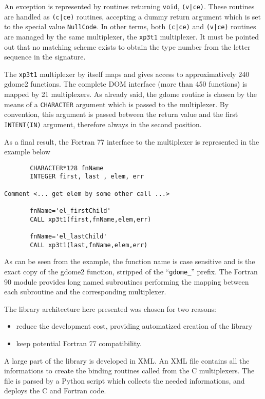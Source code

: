 An exception is represented by routines returning \texttt{void},
\texttt{(v|ce)}. These routines are handled as \texttt{(c|ce)} routines,
accepting a dummy return argument which is set to the special value
\texttt{NullCode}. In other terms, both \texttt{(c|ce)} and \texttt{(v|ce)}
routines are managed by the same multiplexer, the \texttt{xp3t1} multiplexer.
It must be pointed out that no matching scheme exists to obtain the type
number from the letter sequence in the signature. 

The \texttt{xp3t1} multiplexer by itself maps and gives access to
approximatively 240 gdome2 functions. The complete DOM interface (more than
450 functions) is mapped by 21 multiplexers. As already said, the
gdome routine is chosen by the means of a \texttt{CHARACTER} argument which
is passed to the multiplexer.  By convention, this argument is passed
between the return value and the first \texttt{INTENT(IN)} argument,
therefore always in the second position. 

As a final result, the Fortran 77 interface to the multiplexer is
represented in the example below

{
\footnotesize
\begin{verbatim}
       CHARACTER*128 fnName
       INTEGER first, last , elem, err

Comment <... get elem by some other call ...>

       fnName='el_firstChild'
       CALL xp3t1(first,fnName,elem,err)

       fnName='el_lastChild'
       CALL xp3t1(last,fnName,elem,err)
\end{verbatim}
}
As can be seen from the example, the function name is case sensitive and is
the exact copy of the gdome2 function, stripped of the ``\texttt{gdome\_}''
prefix.  The Fortran 90 module provides long named subroutines performing
the mapping between each subroutine and the corresponding multiplexer.

The library architecture here presented was chosen for two reasons: 
\begin{itemize}
\item reduce the development cost, providing automatized creation of the
library
\item keep potential Fortran 77 compatibility.
\end{itemize}

A large part of the library is developed in XML. An XML file contains all
the informations to create the binding routines called from the C
multiplexers.  The file is parsed by a Python script which
collects the needed informations, and deploys the C and Fortran code. 


